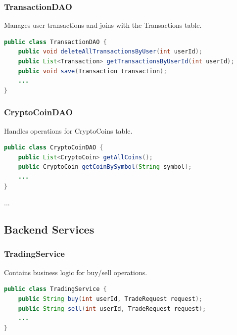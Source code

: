 \documentclass[a4paper,12pt]{article}
\begin{document}
\subsubsection{TransactionDAO}
Manages user transactions and joins with the Transactions table.

\begin{lstlisting}[language=Java]
public class TransactionDAO {
    public void deleteAllTransactionsByUser(int userId);
    public List<Transaction> getTransactionsByUserId(int userId);
    public void save(Transaction transaction);
    ...
}
\end{lstlisting}

\subsubsection{CryptoCoinDAO}
Handles operations for CryptoCoins table.

\begin{lstlisting}[language=Java]
public class CryptoCoinDAO {
    public List<CryptoCoin> getAllCoins();
    public CryptoCoin getCoinBySymbol(String symbol);
    ...
}
\end{lstlisting}
...

\subsection{Backend Services}


\subsubsection{TradingService}
Contains business logic for buy/sell operations.

\begin{lstlisting}[language=Java]
public class TradingService {
    public String buy(int userId, TradeRequest request);
    public String sell(int userId, TradeRequest request);
    ...
}
\end{lstlisting}
\end{document}
